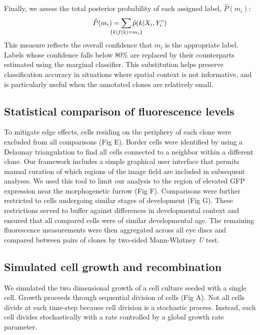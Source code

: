 \documentclass[10pt,letterpaper]{article}
\begin{document}
Finally, we assess the total posterior probability of each assigned label, $\hat{P}(m_i)$:
\begin{eqnarray}
\hat{P}(m_i) = \sum_{ \mathclap{ \{ k | f(k)=m_i \}} } \hat{p}(k | X_i,Y^c_i)
\end{eqnarray}
This measure reflects the overall confidence that $m_i$ is the appropriate label. Labels whose confidence falls below 80\% are replaced by their counterparts estimated using the marginal classifier. This substitution helps preserve classification accuracy in situations where spatial context is not informative, and is particularly useful when the annotated clones are relatively small.

\subsection*{Statistical comparison of fluorescence levels}

To mitigate edge effects, cells residing on the periphery of each clone were excluded from all comparisons (Fig E). Border cells were identified by using a Delaunay triangulation to find all cells connected to a neighbor within a different clone. Our framework includes a simple graphical user interface that permits manual curation of which regions of the image field are included in subsequent analyses. We used this tool to limit our analysis to the region of elevated GFP expression near the morphogenetic furrow (Fig F). Comparisons were further restricted to cells undergoing similar stages of development (Fig G). These restrictions served to buffer against differences in developmental context and ensured that all compared cells were of similar developmental age. The remaining fluorescence measurements were then aggregated across all eye discs and compared between pairs of clones by two-sided Mann-Whitney \textit{U} test.

\subsection*{Simulated cell growth and recombination}

We simulated the two dimensional growth of a cell culture seeded with a single cell. Growth proceeds through sequential division of cells (Fig A). Not all cells divide at each time-step because cell division is a stochastic process. Instead, each cell divides stochastically with a rate controlled by a global growth rate parameter.
\end{document}

